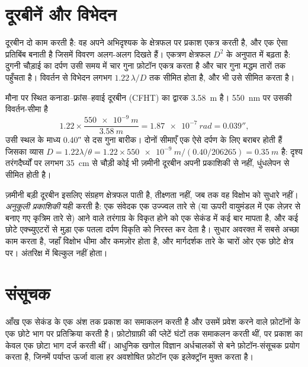 \section{दूरबीनें और विभेदन}

दूरबीन दो काम करती है: वह अपने अभिदृश्यक के क्षेत्रफल पर प्रकाश एकत्र करती है, और एक ऐसा प्रतिबिंब
बनाती है जिसमें विवरण अलग-अलग दिखते हैं। एकत्रण क्षेत्रफल $D^2$ के अनुपात में बढ़ता है: दुगनी
चौड़ाई का दर्पण उसी समय में चार गुना फ़ोटॉन एकत्र करता है और चार गुना मद्धम तारों तक पहुँचता है।
विवर्तन से विभेदन लगभग $1.22\,\lambda/D$ तक सीमित होता है, और  भी उसे सीमित करता है।

\begin{example}
मौना पर स्थित कनाडा–फ़्रांस–हवाई दूरबीन (CFHT) का द्वारक \qty{3.58}{m} है। \qty{550}{nm} पर उसकी
विवर्तन-सीमा है
\[
  1.22\times\frac{\qty{550e-9}{m}}{\qty{3.58}{m}} = \qty{1.87e-7}{rad}
  = \ang{;;0.039},
\]
उसी स्थल के माध्य  \ang{;;0.40} से दस गुना बारीक। दोनों सीमाएँ एक ऐसे दर्पण के लिए
बराबर होती हैं जिसका व्यास $D = 1.22\lambda/\theta =
1.22\times\qty{550e-9}{m}/(\num{0.40}/\num{206265}) = \qty{0.35}{m}$ है: दृश्य तरंगदैर्घ्यों पर
लगभग \qty{35}{cm} से चौड़ी कोई भी ज़मीनी दूरबीन अपनी प्रकाशिकी से नहीं, धुंधलेपन से सीमित होती है।
\end{example}

ज़मीनी बड़ी दूरबीन इसलिए संग्रहण क्षेत्रफल पाती है, तीक्ष्णता नहीं, जब तक वह विक्षोभ को सुधारे नहीं।
\emph{अनुकूली प्रकाशिकी} यही करती है: एक संवेदक एक उज्ज्वल तारे से (या
ऊपरी वायुमंडल में एक लेज़र से बनाए गए कृत्रिम तारे से) आने वाले तरंगाग्र के विकृत होने को
एक सेकंड में कई बार मापता है, और कई छोटे एक्च्युएटरों से मुड़ा एक पतला दर्पण विकृति को
निरस्त कर देता है। सुधार अवरक्त में सबसे अच्छा काम करता है, जहाँ विक्षोभ धीमा और कमज़ोर होता
है, और मार्गदर्शक तारे के चारों ओर एक छोटे क्षेत्र पर। अंतरिक्ष में  बिल्कुल नहीं होता।

\section{संसूचक}

आँख एक सेकंड के एक अंश तक प्रकाश का समाकलन करती है और उसमें प्रवेश करने वाले फ़ोटॉनों के एक छोटे
भाग पर प्रतिक्रिया करती है। फ़ोटोग्राफ़ी की प्लेटें घंटों तक समाकलन करती थीं, पर प्रकाश का केवल एक
छोटा भाग दर्ज करती थीं। आधुनिक खगोल विज्ञान अर्धचालकों से बने फ़ोटॉन-संसूचक प्रयोग करता है, जिनमें
पर्याप्त ऊर्जा वाला हर अवशोषित फ़ोटॉन एक इलेक्ट्रॉन मुक्त करता है।

